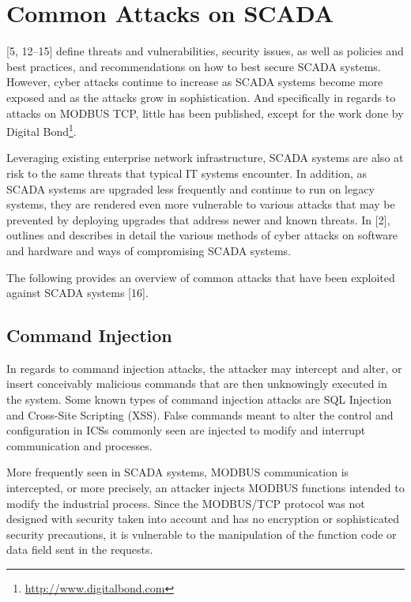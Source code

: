 \documentclass[11pt,]{article}
\let\rmarkdownfootnote\footnote%
\def\footnote{\protect\rmarkdownfootnote}
\begin{document}
\clearpage

\section{Common Attacks on SCADA}\label{common-attacks-on-scada}

{[}5, 12--15{]} define threats and vulnerabilities, security issues, as
well as policies and best practices, and recommendations on how to best
secure SCADA systems. However, cyber attacks continue to increase as
SCADA systems become more exposed and as the attacks grow in
sophistication. And specifically in regards to attacks on MODBUS TCP,
little has been published, except for the work done by Digital
Bond\footnote{\url{http://www.digitalbond.com}}.

Leveraging existing enterprise network infrastructure, SCADA systems are
also at risk to the same threats that typical IT systems encounter. In
addition, as SCADA systems are upgraded less frequently and continue to
run on legacy systems, they are rendered even more vulnerable to various
attacks that may be prevented by deploying upgrades that address newer
and known threats. In {[}2{]}, outlines and describes in detail the
various methods of cyber attacks on software and hardware and ways of
compromising SCADA systems.

The following provides an overview of common attacks that have been
exploited against SCADA systems {[}16{]}.

\subsection{Command Injection}\label{command-injection}

In regards to command injection attacks, the attacker may intercept and
alter, or insert conceivably malicious commands that are then
unknowingly executed in the system. Some known types of command
injection attacks are SQL Injection and Cross-Site Scripting (XSS).
False commands meant to alter the control and configuration in ICSs
commonly seen are injected to modify and interrupt communication and
processes.

More frequently seen in SCADA systems, MODBUS communication is
intercepted, or more precisely, an attacker injects MODBUS functions
intended to modify the industrial process. Since the MODBUS/TCP protocol
was not designed with security taken into account and has no encryption
or sophisticated security precautions, it is vulnerable to the
manipulation of the function code or data field sent in the requests.
\end{document}
